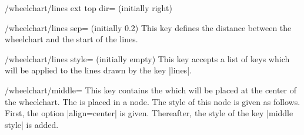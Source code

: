 \documentclass[a4paper,english,dvipsnames]{ltxdoc}
\begin{document}
\begin{key}{/wheelchart/lines ext top dir= (initially right)}
\begin{codeexample}[width=10cm,preamble={\usepackage{etoolbox}
\usetikzlibrary{decorations.markings}}]
\end{codeexample}
\begin{codeexample}[width=10cm]
\begin{tikzpicture}
\wheelchart[
    data style={
        inner sep=0pt,
        shift={(0,0.1)}
    },
    lines,
    lines ext=1.2,
    lines ext bottom dir=right,
    lines ext dirsep=1,
    lines ext left anchor={base west},
    lines ext right anchor={base east},
    lines ext top dir=left,
    lines sep=-0.5,
    start angle=331.2
]{\exampleforthismanual}
\end{tikzpicture}
\end{codeexample}
\begin{codeexample}[width=10cm,preamble={\usetikzlibrary{decorations.markings}}]
\begin{tikzpicture}
\wheelchart[
    data={\WCvarC: \WCvarA},
    data angle shift=\WCvarG,
    data style={draw=\WCvarB,fill=\WCvarB!20},
    lines=1.5,
    lines ext=1,
    lines sep=-1,
    lines style={
        Black,
        postaction=decorate,
        decoration={
            markings,
            mark=at position 0 with {
                \fill[Black] (0,0) circle[radius=0.15];
            }
        }
    },
    pie,
    start angle=331.2
]{\exampleforthismanual}
\end{tikzpicture}
\end{codeexample}
\end{key}
\begin{key}{/wheelchart/lines sep= (initially 0.2)}
This key defines the distance between the wheelchart and the start of the lines.
\end{key}
\begin{stylekey}{/wheelchart/lines style= (initially \normalfont empty)}
This key accepts a list of keys which will be applied to the lines drawn by the key |lines|.
\end{stylekey}
\begin{key}{/wheelchart/middle=}
This key contains the  which will be placed at the center of the wheelchart. The  is placed in a node. The style of this node is given as follows. First, the option |align=center| is given. Thereafter, the style of the key |middle style| is added.
\end{key}
\end{document}
